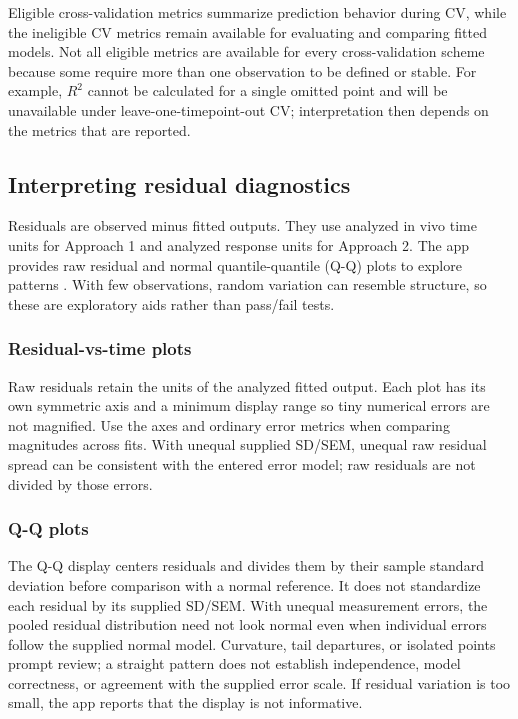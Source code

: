 Eligible cross-validation metrics summarize prediction behavior during CV, while the ineligible CV metrics remain available for evaluating and comparing fitted models. Not all eligible metrics are available for every cross-validation scheme because some require more than one observation to be defined or stable. For example, \(R^2\) cannot be calculated for a single omitted point and will be unavailable under leave-one-timepoint-out CV; interpretation then depends on the metrics that are reported.


\subsection{Interpreting residual diagnostics}

Residuals are observed minus fitted outputs. They use analyzed in vivo time units for Approach 1 and analyzed response units for Approach 2. The app provides raw residual and normal quantile-quantile (Q-Q) plots to explore patterns \cite{kutner2005}. With few observations, random variation can resemble structure, so these are exploratory aids rather than pass/fail tests.

\subsubsection*{Residual-vs-time plots}

Raw residuals retain the units of the analyzed fitted output. Each plot has its own symmetric axis and a minimum display range so tiny numerical errors are not magnified. Use the axes and ordinary error metrics when comparing magnitudes across fits. With unequal supplied SD/SEM, unequal raw residual spread can be consistent with the entered error model; raw residuals are not divided by those errors.

\subsubsection*{Q-Q plots}

The Q-Q display centers residuals and divides them by their sample standard deviation before comparison with a normal reference. It does not standardize each residual by its supplied SD/SEM. With unequal measurement errors, the pooled residual distribution need not look normal even when individual errors follow the supplied normal model. Curvature, tail departures, or isolated points prompt review; a straight pattern does not establish independence, model correctness, or agreement with the supplied error scale. If residual variation is too small, the app reports that the display is not informative.

